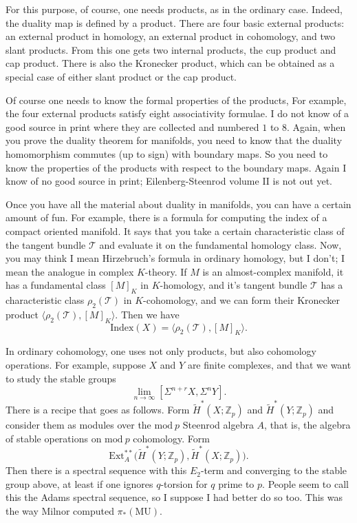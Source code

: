 \documentclass[../main]{subfiles}
\begin{document}
For this purpose, of course, one needs products, as in the ordinary case. Indeed, the duality map is defined by a product. There are four basic external products: an external product in homology, an external product in cohomology, and two slant products. From this one gets two internal products, the cup product and cap product. There is also the Kronecker product, which can be obtained as a special case of either slant product or the cap product.

Of course one needs to know the formal properties of the products, For example, the four external products satisfy eight associativity formulae. I do not know of a good source in print where they are collected and numbered $1$ to $8$. Again, when you prove the duality theorem for manifolds, you need to know that the duality homomorphism commutes (up to sign) with boundary maps. So you need to know the properties of the products with respect to the boundary maps. Again I know of no good source in print; Eilenberg-Steenrod volume II is not out yet.

Once you have all the material about duality in manifolds, you can have a certain amount of fun. For example, there is a formula for computing the index of a compact oriented manifold. It says that you take a certain characteristic class of the tangent bundle $\mathcal{T}$ and evaluate it on the fundamental homology class. Now, you may think I mean Hirzebruch's formula in ordinary homology, but I don't; I mean the analogue in complex $K$-theory. If $M$ is an almost-complex manifold, it has a fundamental class $[M]_K$ in $K$-homology, and it's tangent bundle $\mathcal T$ has a characteristic class $\rho_2(\mathcal T)$ in $K$-cohomology, and we can form their Kronecker product $\langle \rho_2(\mathcal T), [M]_K \rangle$.  Then we have
\[ \mathrm{Index}(X) = \langle \rho_2(\mathcal T), [M]_K \rangle. \]

In ordinary cohomology, one uses not only products, but also cohomology operations. For example, suppose $X$ and $Y$ are finite complexes, and that we want to study the stable groups 
\[ \lim_{n \to \infty} [\Sigma^{n + r}X, \Sigma^nY]. \]
There is a recipe that goes as follows. Form $\tilde H^*(X; \mathbb Z_p)$ and $\tilde H^*(Y; \mathbb Z_p)$ and consider them as modules over the $\mathrm{mod}\ p$ Steenrod algebra $A$, that is, the algebra of stable operations on $\mathrm{mod}\ p$ cohomology. Form 
\[ \mathrm{Ext}_A^{**}\big(\tilde H^*(Y; \mathbb Z_p), \tilde H^*(X; \mathbb Z_p)\big). \]
Then there is a spectral sequence with this $E_2$-term and converging to the stable group above, at least if one ignores $q$-torsion for $q$ prime to $p$. People seem to call this the Adams spectral sequence, so I suppose I had better do so too. This was the way Milnor computed $\pi_*(\mathrm{MU})$.
\end{document}
